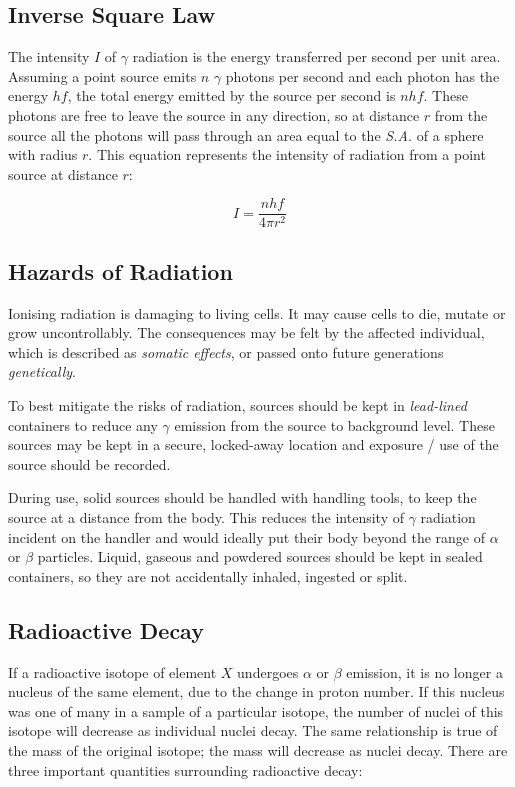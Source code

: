 \documentclass[12pt]{article}
\begin{document}
\subsection{Inverse Square Law}
\label{sec:org12f4a64}

The intensity \(I\) of \(\gamma\) radiation is the energy transferred per second per unit area. Assuming a point source emits \(n\) \(\gamma\) photons per second and each photon has the energy \(hf\), the total energy emitted by the source per second is \(nhf\). These photons are free to leave the source in any direction, so at distance \(r\) from the source all the photons will pass through an area equal to the \emph{S.A.} of a sphere with radius \(r\). This equation represents the intensity of radiation from a point source at distance \(r\):

\[I = \dfrac{nhf}{4 \pi r^2}\]

\subsection{Hazards of Radiation}
\label{sec:orgbcc1c6b}

Ionising radiation is damaging to living cells. It may cause cells to die, mutate or grow uncontrollably. The consequences may be felt by the affected individual, which is described as \emph{somatic effects}, or passed onto future generations \emph{genetically}.

To best mitigate the risks of radiation, sources should be kept in \emph{lead-lined} containers to reduce any \(\gamma\) emission from the source to background level. These sources may be kept in a secure, locked-away location and exposure / use of the source should be recorded.

During use, solid sources should be handled with handling tools, to keep the source at a distance from the body. This reduces the intensity of \(\gamma\) radiation incident on the handler and would ideally put their body beyond the range of \(\alpha\) or \(\beta\) particles. Liquid, gaseous and powdered sources should be kept in sealed containers, so they are not accidentally inhaled, ingested or split.

\subsection{Radioactive Decay}
\label{sec:org8c2c3a6}

If a radioactive isotope of element \(X\) undergoes \(\alpha\) or \(\beta\) emission, it is no longer a nucleus of the same element, due to the change in proton number. If this nucleus was one of many in a sample of a particular isotope, the number of nuclei of this isotope will decrease as individual nuclei decay. The same relationship is true of the mass of the original isotope; the mass will decrease as nuclei decay. There are three important quantities surrounding radioactive decay:
\end{document}

